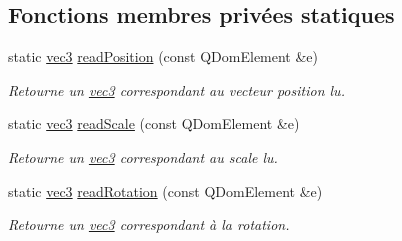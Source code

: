 \subsection*{Fonctions membres privées statiques}
\begin{DoxyCompactItemize}
\item 
static \hyperlink{structvec3}{vec3} \hyperlink{class_scene_a98d11f40f1ac651eae91827ae9ef3d5c}{read\+Position} (const Q\+Dom\+Element \&e)
\begin{DoxyCompactList}\small\item\em Retourne un \hyperlink{structvec3}{vec3} correspondant au vecteur position lu. \end{DoxyCompactList}\item 
static \hyperlink{structvec3}{vec3} \hyperlink{class_scene_a2ea5cfec3f9be76fe110cba255621d7e}{read\+Scale} (const Q\+Dom\+Element \&e)
\begin{DoxyCompactList}\small\item\em Retourne un \hyperlink{structvec3}{vec3} correspondant au scale lu. \end{DoxyCompactList}\item 
static \hyperlink{structvec3}{vec3} \hyperlink{class_scene_a387122d207270b78fc4b1a7714d19614}{read\+Rotation} (const Q\+Dom\+Element \&e)
\begin{DoxyCompactList}\small\item\em Retourne un \hyperlink{structvec3}{vec3} correspondant à la rotation. \end{DoxyCompactList}\end{DoxyCompactItemize}
